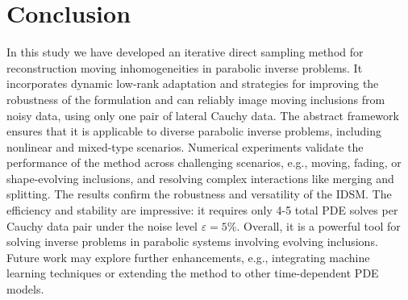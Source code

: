 \documentclass[onefignum,onetabnum]{siamart190516}
\numberwithin{equation}{section}
\begin{document}
\section{Conclusion}\label{sec:CON}
In this study we have developed an iterative direct sampling method for reconstruction moving inhomogeneities in parabolic inverse problems.
It incorporates dynamic low-rank adaptation and strategies for improving the robustness of the formulation and can reliably image moving inclusions from noisy data, using only one pair of lateral Cauchy data.
The abstract framework ensures that it is applicable to diverse parabolic inverse problems, including nonlinear and mixed-type scenarios.
Numerical experiments validate the performance of the method across challenging scenarios, e.g., moving, fading, or shape-evolving inclusions, and resolving complex interactions like merging and splitting.
The results confirm the robustness and versatility of the IDSM.
The efficiency and stability are impressive: it requires only 4-5 total PDE solves per Cauchy data pair under the noise level $\varepsilon = 5\%$.
Overall, it is a powerful tool for solving inverse problems in parabolic systems involving evolving inclusions.
Future work may explore further enhancements, e.g., integrating machine learning techniques or extending the method to other time-dependent PDE models.



\end{document}
